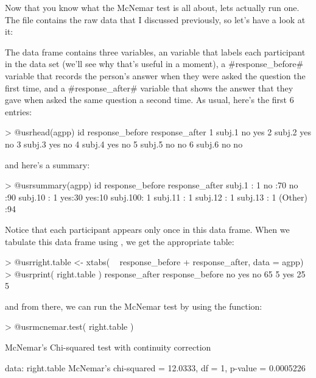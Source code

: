 
Now that you know what the McNemar test is all about, lets actually run one. The  file contains the raw data that I discussed previously, so let's have a look at it:
The  data frame contains three variables, an  variable that labels each participant in the data set (we'll see why that's useful in a moment), a \rtextverb#response_before# variable that records the person's answer when they were asked the question the first time, and a \rtextverb#response_after# variable that shows the answer that they gave when asked the same question a second time. As usual, here's the first 6 entries:
\begin{rblock1}
> @usr{head(agpp)}
      id response_before response_after
1 subj.1              no            yes
2 subj.2             yes             no
3 subj.3             yes             no
4 subj.4             yes             no
5 subj.5              no             no
6 subj.6              no             no
\end{rblock1}
and here's a summary:
\begin{rblock1}
> @usr{summary(agpp)}
        id     response_before response_after
 subj.1  : 1   no :70          no :90        
 subj.10 : 1   yes:30          yes:10        
 subj.100: 1                                 
 subj.11 : 1                                 
 subj.12 : 1                                 
 subj.13 : 1                                 
 (Other) :94             
\end{rblock1}
Notice that each participant appears only once in this data frame. When we tabulate this data frame using , we get the appropriate table:
\begin{rblock1}
> @usr{right.table <- xtabs( ~ response_before + response_after, data = agpp)}
> @usr{print( right.table )}
               response_after
response_before no yes
            no  65   5
            yes 25   5
\end{rblock1}
and from there, we can run the McNemar test by using the  function:
\begin{rblock1}
> @usr{mcnemar.test( right.table )}

	McNemar's Chi-squared test with continuity correction

data:  right.table 
McNemar's chi-squared = 12.0333, df = 1, p-value = 0.0005226
\end{rblock1}
